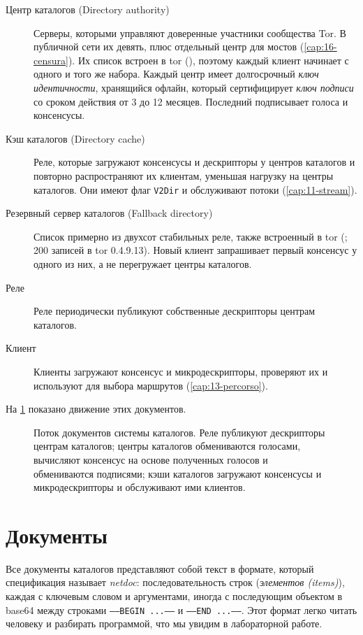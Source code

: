 \begin{description}
  \item[Центр каталогов (Directory authority)] Серверы, которыми управляют доверенные участники сообщества Tor. В публичной сети их девять, плюс отдельный центр для мостов (\cref{cap:16-censura}). Их список встроен в tor (), поэтому каждый клиент начинает с одного и того же набора. Каждый центр имеет долгосрочный \emph{ключ идентичности}, хранящийся офлайн, который сертифицирует \emph{ключ подписи} со сроком действия от 3 до 12 месяцев. Последний подписывает голоса и консенсусы.
  \item[Кэш каталогов (Directory cache)] Реле, которые загружают консенсусы и дескрипторы у центров каталогов и повторно распространяют их клиентам, уменьшая нагрузку на центры каталогов. Они имеют флаг \texttt{V2Dir} и обслуживают потоки  (\cref{cap:11-stream}).
  \item[Резервный сервер каталогов (Fallback directory)] Список примерно из двухсот стабильных реле, также встроенный в tor (; 200 записей в tor 0.4.9.13). Новый клиент запрашивает первый консенсус у одного из них, а не перегружает центры каталогов.
  \item[Реле] Реле периодически публикуют собственные дескрипторы центрам каталогов.
  \item[Клиент] Клиенты загружают консенсус и микродескрипторы, проверяют их и используют для выбора маршрутов (\cref{cap:13-percorso}).
\end{description}

На \cref{fig:dir-flusso} показано движение этих документов.

\begin{figure}[htbp]
\centering

\caption{Поток документов системы каталогов. Реле публикуют дескрипторы центрам каталогов; центры каталогов обмениваются голосами, вычисляют консенсус на основе полученных голосов и обмениваются подписями; кэши каталогов загружают консенсусы и микродескрипторы и обслуживают ими клиентов.}
\label{fig:dir-flusso}
\end{figure}

\section{Документы}\label{sec:dir-documenti}

Все документы каталогов представляют собой текст в формате, который спецификация называет \emph{netdoc}: последовательность строк (\emph{элементов (items)}), каждая с ключевым словом и аргументами, иногда с последующим объектом в base64 между строками \texttt{-----BEGIN ...-----} и \texttt{-----END ...-----}. Этот формат легко читать человеку и разбирать программой, что мы увидим в лабораторной работе.

